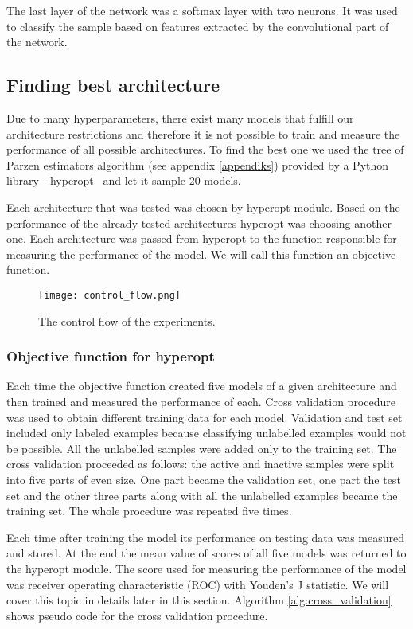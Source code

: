 \documentclass[a4paper,10pt]{report}
\begin{document}
      The last layer of the network was a softmax layer with two neurons. It was used to classify the sample based on features extracted by the convolutional part of the network. 
      
	\subsection{Finding best architecture}
	Due to many hyperparameters, there exist many models that fulfill our architecture restrictions and therefore it is not possible to train and measure the performance of all possible architectures. To find the best one we used the tree of Parzen estimators algorithm (see appendix \ref{appendiks}) provided by a Python library - hyperopt~\cite{HYPEROPT} and let it sample 20 models. 
		
	Each architecture that was tested was chosen by hyperopt module. Based on the performance of the already tested architectures hyperopt was choosing another one. Each architecture was passed from hyperopt to the function responsible for measuring the performance of the model. We will call this function an objective function. 
	
	 \begin{figure}[h!]
	  \centering
	  \texttt{[image: control\_flow.png]}
	  \caption{The control flow of the experiments.}
	  \label{fig:control_flow}
	\end{figure} 
	
	\subsubsection{Objective function for hyperopt}
	Each time the objective function created five models of a given architecture and then trained and measured the performance of each. Cross validation procedure was used to obtain different training data for each model. Validation and test set included only labeled examples because classifying unlabelled examples would not be possible. All the unlabelled samples were added only to the training set. The cross validation proceeded as follows: the active and inactive samples were split into five parts of even size. One part became the validation set, one part the test set and the other three parts along with all the unlabelled examples became the training set. The whole procedure was repeated five times. 
	
	Each time after training the model its performance on testing data was measured and stored. At the end the mean value of scores of all five models was returned to the hyperopt module. The score used for measuring the performance of the model was receiver operating characteristic (ROC) with Youden's J statistic. We will cover this topic in details later in this section. Algorithm \ref{alg:cross_validation} shows pseudo code for the cross validation procedure. 
	
\end{document}
